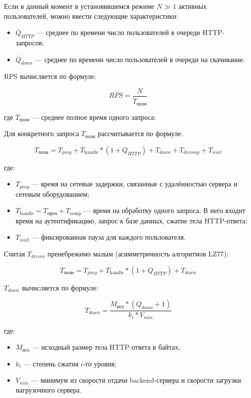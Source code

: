 \documentclass[12pt]{article}
\begin{document}
Если в данный момент в установившемся режиме $N \gg 1$ активных пользователей, можно ввести следующие характеристики:

\begin{itemize}
    \item $\overline{Q}_{HTTP}$ — среднее по времени число пользователей в очереди HTTP-запросов;
    \item $\overline{Q}_{down}$ — среднее по времени число пользователей в очереди на скачивание.
\end{itemize}

RPS вычисляется по формуле:

\[
    RPS = \frac{N}{\overline{T}_{\text{полн}}}
\]

где $\overline{T}_{\text{полн}}$ — среднее полное время одного запроса:

Для конкретного запроса $T_{\text{полн}}$ рассчитывается по формуле:

\begin{equation}
    T_{\text{полн}} = T_{ping} + T_{\text{handle}}*(1 + Q_{HTTP}) + T_{down} + T_{decomp} + T_{wait}
\end{equation}

где:

\begin{itemize}
    \item $T_{ping}$ — время на сетевые задержки, связанные с удалённостью сервера и сетевым оборудованием;
    \item $T_{\text{handle}} = T_{\text{проч}} + T_{\text{сomp}}$ — время на обработку одного запроса. В него входит время на аутентификацию, запрос к базе данных, сжатие тела HTTP-ответа;
    \item $T_{wait}$ — фиксированная пауза для каждого пользователя.
\end{itemize}

Считая $T_{decom}$ пренебрежимо малым (асимметричность алгоритмов LZ77):

\[
    T_{\text{полн}} = T_{ping} + T_{\text{handle}}*(1 + Q_{HTTP}) + T_{down}
\]

$T_{down}$ вычисляется по формуле:

\[
    T_{down} = \frac{M_{\text{исх}}*(Q_{down} + 1)}{k_{i}*V_{min}}
\]

где:

\begin{itemize}
    \item $M_{\text{исх}}$ — исходный размер тела HTTP-ответа в байтах;
    \item $k_{i}$ — степень сжатия $i$-го уровня;
    \item $V_{min}$ — минимум из скорости отдачи backend-сервера и скорости загрузки нагрузочного сервера.
\end{itemize}
\end{document}
